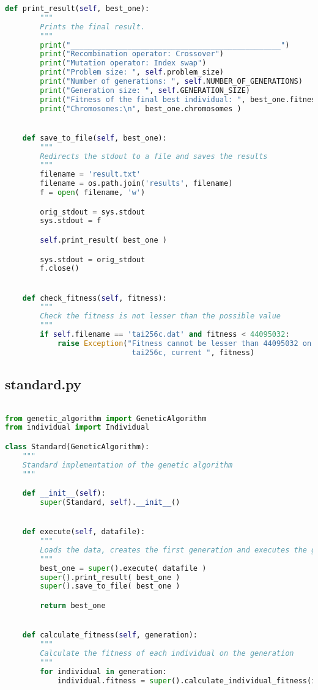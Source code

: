 \begin{lstlisting}[language=python]
    def print_result(self, best_one):
        """
        Prints the final result.
        """
        print("________________________________________________")
        print("Recombination operator: Crossover")
        print("Mutation operator: Index swap")
        print("Problem size: ", self.problem_size)
        print("Number of generations: ", self.NUMBER_OF_GENERATIONS)
        print("Generation size: ", self.GENERATION_SIZE)
        print("Fitness of the final best individual: ", best_one.fitness)
        print("Chromosomes:\n", best_one.chromosomes )


    def save_to_file(self, best_one):
        """
        Redirects the stdout to a file and saves the results
        """
        filename = 'result.txt'
        filename = os.path.join('results', filename)
        f = open( filename, 'w')

        orig_stdout = sys.stdout
        sys.stdout = f

        self.print_result( best_one )

        sys.stdout = orig_stdout
        f.close()


    def check_fitness(self, fitness):
        """
        Check the fitness is not lesser than the possible value
        """
        if self.filename == 'tai256c.dat' and fitness < 44095032:
            raise Exception("Fitness cannot be lesser than 44095032 on file \
                             tai256c, current ", fitness)

\end{lstlisting}

\newpage

\subsection*{standard.py}
\begin{lstlisting}[language=python]

from genetic_algorithm import GeneticAlgorithm
from individual import Individual

class Standard(GeneticAlgorithm):
    """
    Standard implementation of the genetic algorithm
    """

    def __init__(self):
        super(Standard, self).__init__()


    def execute(self, datafile):
        """
        Loads the data, creates the first generation and executes the genetic algorithm on each generation overloading and executing the child 'calculate_fitness' function. Finally returns the best of 'em all.
        """
        best_one = super().execute( datafile )
        super().print_result( best_one )
        super().save_to_file( best_one )

        return best_one


    def calculate_fitness(self, generation):
        """
        Calculate the fitness of each individual on the generation
        """
        for individual in generation:
            individual.fitness = super().calculate_individual_fitness(individual)
\end{lstlisting}

